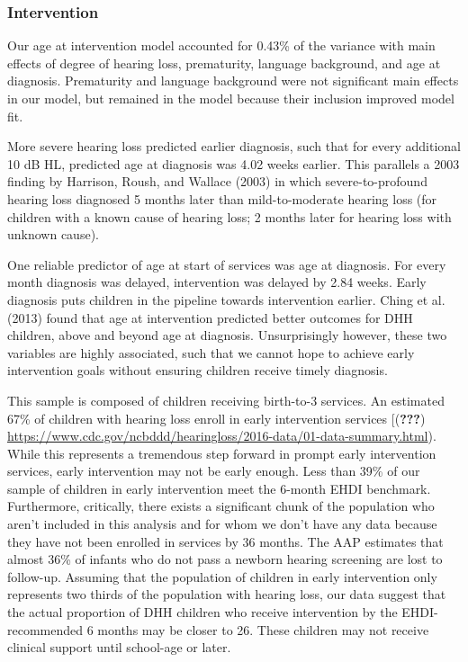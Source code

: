 \documentclass[english,man]{apa6}
\begin{document}
\hypertarget{intervention}{%
\subsubsection{Intervention}\label{intervention}}

Our age at intervention model accounted for 0.43\% of the variance with main effects of degree of hearing loss, prematurity, language background, and age at diagnosis. Prematurity and language background were not significant main effects in our model, but remained in the model because their inclusion improved model fit.

More severe hearing loss predicted earlier diagnosis, such that for every additional 10 dB HL, predicted age at diagnosis was 4.02 weeks earlier. This parallels a 2003 finding by Harrison, Roush, and Wallace (2003) in which severe-to-profound hearing loss diagnosed 5 months later than mild-to-moderate hearing loss (for children with a known cause of hearing loss; 2 months later for hearing loss with unknown cause).

One reliable predictor of age at start of services was age at diagnosis. For every month diagnosis was delayed, intervention was delayed by 2.84 weeks. Early diagnosis puts children in the pipeline towards intervention earlier. Ching et al. (2013) found that age at intervention predicted better outcomes for DHH children, above and beyond age at diagnosis. Unsurprisingly however, these two variables are highly associated, such that we cannot hope to achieve early intervention goals without ensuring children receive timely diagnosis.

This sample is composed of children receiving birth-to-3 services. An estimated 67\% of children with hearing loss enroll in early intervention services {[}({\textbf{???}}) \url{https://www.cdc.gov/ncbddd/hearingloss/2016-data/01-data-summary.html}). While this represents a tremendous step forward in prompt early intervention services, early intervention may not be early enough. Less than 39\% of our sample of children in early intervention meet the 6-month EHDI benchmark. Furthermore, critically, there exists a significant chunk of the population who aren't included in this analysis and for whom we don't have any data because they have not been enrolled in services by 36 months. The AAP estimates that almost 36\% of infants who do not pass a newborn hearing screening are lost to follow-up. Assuming that the population of children in early intervention only represents two thirds of the population with hearing loss, our data suggest that the actual proportion of DHH children who receive intervention by the EHDI-recommended 6 months may be closer to 26. These children may not receive clinical support until school-age or later.
\end{document}
